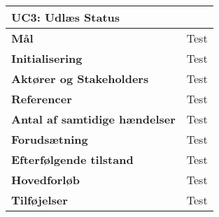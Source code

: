 \begin{table}[H] \centering
\begin{tabular}{|p{6cm}|p{8cm}|}
	\hline
\multicolumn{2}{|l|}{\textbf{UC3: Udlæs Status}} \\\hline
\textbf{Mål}								&Test \\\hline
\textbf{Initialisering}					&Test \\\hline
\textbf{Aktører og Stakeholders}			&Test \\\hline
\textbf{Referencer}						&Test \\\hline
\textbf{Antal af samtidige hændelser}	&Test \\\hline
\textbf{Forudsætning}					&Test \\\hline
\textbf{Efterfølgende tilstand}			&Test \\\hline
\textbf{Hovedforløb}						&Test \\\hline
\textbf{Tilføjelser}						&Test \\\hline
	\end{tabular}
	\label{UC3} 
\end{table}